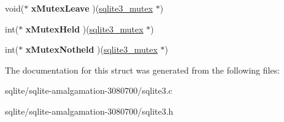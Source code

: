\begin{DoxyCompactItemize}
\item 
\hypertarget{structsqlite3__mutex__methods_acfa193f9130bfc68caf7f1849bcd0dac}{void($\ast$ {\bfseries x\+Mutex\+Leave} )(\hyperlink{structsqlite3__mutex}{sqlite3\+\_\+mutex} $\ast$)}\label{structsqlite3__mutex__methods_acfa193f9130bfc68caf7f1849bcd0dac}

\item 
\hypertarget{structsqlite3__mutex__methods_a5d30a95c614bc08fe156c9ea0f0d88e8}{int($\ast$ {\bfseries x\+Mutex\+Held} )(\hyperlink{structsqlite3__mutex}{sqlite3\+\_\+mutex} $\ast$)}\label{structsqlite3__mutex__methods_a5d30a95c614bc08fe156c9ea0f0d88e8}

\item 
\hypertarget{structsqlite3__mutex__methods_a7bc1edfd01c67c6dcee26299bc31a7bf}{int($\ast$ {\bfseries x\+Mutex\+Notheld} )(\hyperlink{structsqlite3__mutex}{sqlite3\+\_\+mutex} $\ast$)}\label{structsqlite3__mutex__methods_a7bc1edfd01c67c6dcee26299bc31a7bf}

\end{DoxyCompactItemize}


The documentation for this struct was generated from the following files\+:\begin{DoxyCompactItemize}
\item 
sqlite/sqlite-\/amalgamation-\/3080700/sqlite3.\+c\item 
sqlite/sqlite-\/amalgamation-\/3080700/sqlite3.\+h\end{DoxyCompactItemize}
